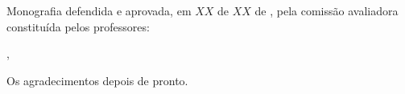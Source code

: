 \documentclass[
	12pt,				%
	openright,			%
	twoside,			%
	a4paper,			%
	english,			%
	brazil				%
	]{abntex2ufop} %
\begin{document}

%
% 
%
\begin{folhadeaprovacao}
% 
   Monografia defendida e aprovada, em $XX$ de $XX$ de \imprimirdata, pela comiss{\~a}o avaliadora constitu{\'i}da pelos professores:
   \vspace*{\fill}
   \vspace*{\fill}
   \vspace*{\fill}
   \vspace*{\fill}
      
   \begin{center}
    \vspace*{0.5cm}
    {\large\imprimirlocal}, {\large\imprimirdata}
    \vspace*{1cm}
  \end{center}
  
\end{folhadeaprovacao}


\begin{agradecimentos}
\noindent Os agradecimentos depois de pronto.

\end{agradecimentos}
\end{document}
